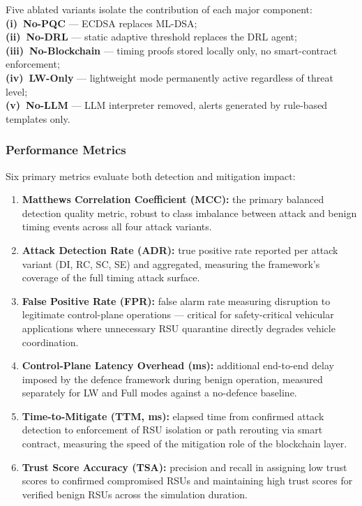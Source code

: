 Five ablated variants isolate the contribution of each major
component: \\\textbf{(i)~No-PQC} — ECDSA replaces ML-DSA;
\\\textbf{(ii)~No-DRL} — static adaptive threshold replaces the DRL
agent; \\\textbf{(iii)~No-Blockchain} — timing proofs stored locally
only, no smart-contract enforcement; \\\textbf{(iv)~LW-Only} —
lightweight mode permanently active regardless of threat level;
\\\textbf{(v)~No-LLM} — LLM interpreter removed, alerts generated
by rule-based templates only.

\subsubsection{Performance Metrics}

Six primary metrics evaluate both detection and mitigation impact:

\begin{enumerate}

\item \textbf{Matthews Correlation Coefficient (MCC):} the primary
balanced detection quality metric, robust to class imbalance between
attack and benign timing events across all four attack variants.

\item \textbf{Attack Detection Rate (ADR):} true positive rate
reported per attack variant (DI, RC, SC, SE) and aggregated,
measuring the framework's coverage of the full timing attack surface.

\item \textbf{False Positive Rate (FPR):} false alarm rate measuring
disruption to legitimate control-plane operations — critical for
safety-critical vehicular applications where unnecessary RSU
quarantine directly degrades vehicle coordination.

\item \textbf{Control-Plane Latency Overhead (ms):} additional
end-to-end delay imposed by the defence framework during benign
operation, measured separately for LW and Full modes against a
no-defence baseline.

\item \textbf{Time-to-Mitigate (TTM, ms):} elapsed time from
confirmed attack detection to enforcement of RSU isolation or
path rerouting via smart contract, measuring the speed of the
mitigation role of the blockchain layer.

\item \textbf{Trust Score Accuracy (TSA):} precision and recall
in assigning low trust scores to confirmed compromised RSUs
and maintaining high trust scores for verified benign RSUs
across the simulation duration.

\end{enumerate}

